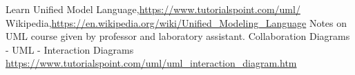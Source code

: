 \begin{thebibliography}{99999}
\singlespace\normalsize

 Learn Unified Model Language,\url{https://www.tutorialspoint.com/uml/}
 Wikipedia,\url{https://en.wikipedia.org/wiki/Unified_Modeling_Language}
 Notes on UML course given by professor and laboratory assistant.
 Collaboration Diagrams - UML - Interaction Diagrams \url{https://www.tutorialspoint.com/uml/uml_interaction_diagram.htm}




\end{thebibliography}
